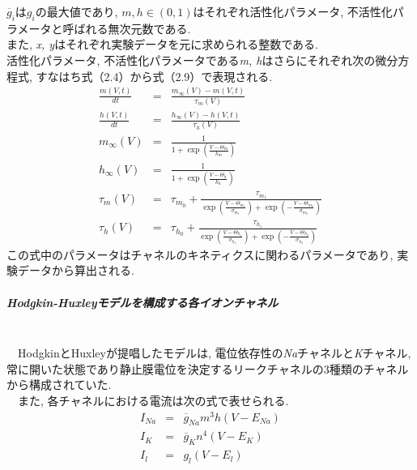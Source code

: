 $\overline{g}_i$は$g_i$の最大値であり, $m, h \in (0, 1)$はそれぞれ活性化パラメータ, 不活性化パラメータと呼ばれる無次元数である.\\
また, {\it x, y}はそれぞれ実験データを元に求められる整数である.\\
活性化パラメータ, 不活性化パラメータである{\it m, h}はさらにそれぞれ次の微分方程式, すなはち式（2.4）から式（2.9）で表現される.\\
\begin{eqnarray}
  \frac{m(V,t)}{dt} & = &\frac{m_\infty(V) - m(V, t)}{\tau_m(V)}\\
  \frac{h(V,t)}{dt} & = &\frac{h_\infty(V) - h(V, t)}{\tau_h(V)}\\
  m_\infty(V) & = & \frac{1}{1 + \exp(\frac{V - \Theta_m}{k_m})}\\
  h_\infty(V) & = & \frac{1}{1 + \exp(\frac{V - \Theta_h}{k_h})}\\
  \tau_m(V) & = & \tau_{m_0} + \frac{\tau_{m_1}}{\exp(\frac{V - \Theta_{m_1}}{\sigma_{m_1}}) + \exp(-\frac{V - \Theta_{m_2}}{\sigma_{m_2}})}\\
  \tau_h(V) & = & \tau_{h_0} + \frac{\tau_{h_1}}{\exp(\frac{V - \Theta_{h_1}}{\sigma_{h_1}}) + \exp(-\frac{V - \Theta_{h_2}}{\sigma_{h_2}})}
\end{eqnarray}
この式中のパラメータはチャネルのキネティクスに関わるパラメータであり, 実験データから算出される.\\

\subparagraph{Hodgkin-Huxleyモデルを構成する各イオンチャネル}~\\
　HodgkinとHuxleyが提唱したモデルは, 電位依存性の{\it Na}チャネルと{\it K}チャネル,
常に開いた状態であり静止膜電位を決定するリークチャネルの3種類のチャネルから構成されていた.\\
　また, 各チャネルにおける電流は次の式で表せられる.\\
\begin{eqnarray}
  I_{Na} & = & \overline{g}_{Na}m^3h(V - E_{Na})\\
  I_{K} & = & \overline{g}_{K}n^4(V - E_{K})\\
  I_{l} & =& g_l(V - E_l)
\end{eqnarray}

